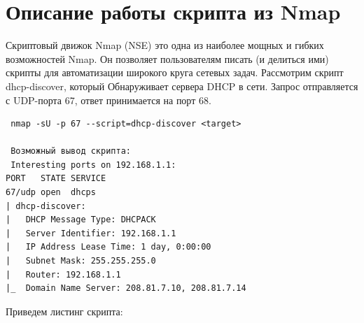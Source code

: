 \documentclass[10pt,a4paper]{report}
\begin{document}
\section{Описание работы скрипта из Nmap}
Скриптовый движок Nmap (NSE) это одна из наиболее мощных и гибких возможностей Nmap. Он позволяет пользователям писать (и делиться ими) скрипты для автоматизации широкого круга сетевых задач. 
Рассмотрим скрипт  	dhcp-discover, который Обнаруживает сервера DHCP в сети. Запрос отправляется с UDP-порта 67, ответ принимается на порт 68.
\begin{verbatim}
 nmap -sU -p 67 --script=dhcp-discover <target>
 
 Возможный вывод скрипта:
 Interesting ports on 192.168.1.1:
PORT   STATE SERVICE
67/udp open  dhcps
| dhcp-discover:
|   DHCP Message Type: DHCPACK
|   Server Identifier: 192.168.1.1
|   IP Address Lease Time: 1 day, 0:00:00
|   Subnet Mask: 255.255.255.0
|   Router: 192.168.1.1
|_  Domain Name Server: 208.81.7.10, 208.81.7.14
\end{verbatim}
Приведем листинг скрипта:
\end{document}
